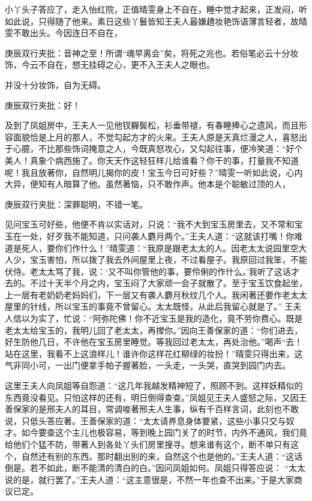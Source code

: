 \begin{parag}


    小丫头子答应了，走入怡红院，正值晴雯身上不自在，睡中觉才起来，正发闷，听如此说，只得随了他来。素日这些丫鬟皆知王夫人最嫌趫妆艳饰语薄言轻者，故晴雯不敢出头。今因连日不自在，\begin{note}庚辰双行夹批：音神之至！所谓“魂早离会”矣，将死之兆也。若俗笔必云十分妆饰，今云不自在，想无挂碍之心，更不入王夫人之眼也。\end{note}并没十分妆饰，自为无碍。\begin{note}庚辰双行夹批：好！\end{note}及到了凤姐房中，王夫人一见他钗軃鬓松，衫垂带褪，有春睡捧心之遗风，而且形容面貌恰是上月的那人，不觉勾起方才的火来。王夫人原是天真烂漫之人，喜怒出于心臆，不比那些饰词掩意之人，今既真怒攻心，又勾起往事，便冷笑道：“好个美人！真象个病西施了。你天天作这轻狂样儿给谁看？你干的事，打量我不知道呢！我且放著你，自然明儿揭你的皮！宝玉今日可好些？”晴雯一听如此说，心内大异，便知有人暗算了他。虽然著恼，只不敢作声。他本是个聪敏过顶的人，\begin{note}庚辰双行夹批：深罪聪明，不错一笔。\end{note}见问宝玉可好些，他便不肯以实话对，只说：“我不大到宝玉房里去，又不常和宝玉在一处，好歹我不能知道，只问袭人麝月两个。”王夫人道：“这就该打嘴！你难道是死人，要你们作什么！”晴雯道：“我原是跟老太太的人。因老太太说园里空大人少，宝玉害怕，所以拨了我去外间屋里上夜，不过看屋子。我原回过我笨，不能伏侍。老太太骂了我，说：‘又不叫你管他的事，要伶俐的作什么。’我听了这话才去的。不过十天半个月之内，宝玉闷了大家顽一会子就散了。至于宝玉饮食起坐，上一层有老奶奶老妈妈们，下一层又有袭人麝月秋纹几个人。我闲著还要作老太太屋里的针线，所以宝玉的事竟不曾留心。太太既怪，从此后我留心就是了。” 王夫人信以为实了，忙说：“阿弥陀佛！你不近宝玉是我的造化，竟不劳你费心。既是老太太给宝玉的，我明儿回了老太太，再撵你。”因向王善保家的道：“你们进去，好生防他几日，不许他在宝玉房里睡觉。等我回过老太太，再处治他。”喝声“去！站在这里，我看不上这浪样儿！谁许你这样花红柳绿的妆扮！”晴雯只得出来，这气非同小可，一出门便拿手帕子握著脸，一头走，一头哭，直哭到园门内去。
\end{parag}


\begin{parag}


    这里王夫人向凤姐等自怨道：“这几年我越发精神短了，照顾不到。这样妖精似的东西竟没看见。只怕这样的还有，明日倒得查查。”凤姐见王夫人盛怒之际，又因王善保家的是邢夫人的耳目，常调唆著邢夫人生事，纵有千百样言词，此刻也不敢说，只低头答应著。王善保家的道：“太太请养息身体要紧，这些小事只交与奴才。如今要查这个主儿也极容易，等到晚上园门关了的时节，内外不通风，我们竟给他们个猛不防，带著人到各处丫头们房里搜寻。想来谁有这个，断不单只有这个，自然还有别的东西。那时翻出别的来，自然这个也是他的。”王夫人道：“这话倒是。若不如此，断不能清的清白的白。”因问凤姐如何。凤姐只得答应说： “太太说的是，就行罢了。”王夫人道：“这主意很是，不然一年也查不出来。”于是大家商议已定。
\end{parag}



